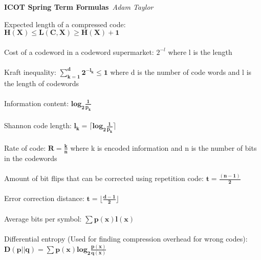 \documentclass{article}
\begin{document}
\begin{center}
\Large\textbf{ICOT Spring Term Formulas}\
\large\textit{Adam Taylor}
\newline
\end{center}
Expected length of a compressed code: \\
$\mathbf{H(X) \leq L(C,X)\geq H(X)+1}$\\\\
Cost of a codeword in a codeword supermarket: $2^{-l}$ where l is the length \\\\
Kraft inequality: $\mathbf{\sum\limits_{k=1}^{d}2^{{-l_k}}\leq1}$ where d is the number of code words and l is the length of codewords\\\\
Information content: $\mathbf{log_2\frac{1}{p_k}}$\\\\
Shannon code length: $\mathbf {l_k = \lceil log_2\frac{1}{p_k}\rceil }$\\\\
Rate of code: $\mathbf{R=\frac{k}{n}}$ where k is encoded information and n is the number of bits in the codewords\\\\
Amount of bit flips that can be corrected using repetition code: $\mathbf{t = \frac{(n-1)}{2}}$\\\\
Error correction distance: $\mathbf{t=\lfloor\frac{d-1}{2}\rfloor}$\\\\
Average bits per symbol: $\mathbf{\sum p(x)l(x)}$\\\\
Differential entropy (Used for finding compression overhead for wrong codes):$\mathbf{D(p||q)=\sum p(x)log_2\frac{p(x)}{q(x)}}$\\\
\end{document}
